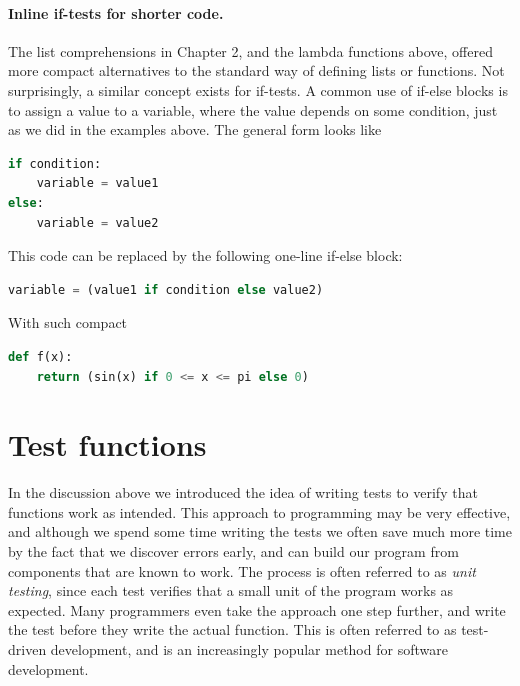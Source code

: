 \documentclass[graybox,envcountchap,sectrefs,final]{svmonodo}
\begin{document}
\paragraph{Inline if-tests for shorter code.}
The list comprehensions in Chapter 2, and the lambda functions above, offered more compact alternatives to the
standard way of defining lists or functions. Not surprisingly, a similar concept exists for if-tests. A common use of if-else
blocks is to assign a value to a variable, where the value depends on some condition, just as we did
in the examples above. The general form looks like
\begin{lstlisting}[language=Python,style=blue1]
if condition:
    variable = value1
else:
    variable = value2
\end{lstlisting}
This code can be replaced by the following one-line if-else block:
\begin{lstlisting}[language=Python,style=blue1]
variable = (value1 if condition else value2)
\end{lstlisting}
With such compact

\begin{lstlisting}[language=Python,style=blue1]
def f(x):
    return (sin(x) if 0 <= x <= pi else 0)
\end{lstlisting}



\section{Test functions}

In the discussion above we introduced the idea of writing tests to verify that functions work as intended. This approach
to programming may be very effective, and although we spend some time writing the tests we often save much more
time by the fact that we discover errors early, and can build our program from components that are known to work. The
process is often referred to as \emph{unit testing}, since each test verifies that a small unit of the program works as
expected. Many programmers even
take the approach one step further, and write the test before they write the actual function. This is often referred to as
test-driven development, and is an increasingly popular method for software development.
\end{document}
